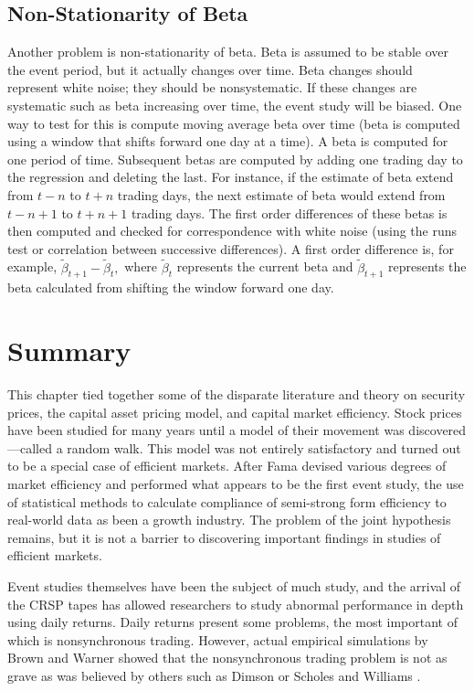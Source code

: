 \subsection{Non-Stationarity of Beta}

Another problem is non-stationarity of beta.  Beta is
assumed to be stable over the event period, but it actually
changes over time.  Beta changes should represent white
noise; they should be nonsystematic.
If these changes are systematic such as
beta increasing over time, the event study will be biased. 
One way to test for this is compute moving average beta over
time (beta is computed using a window that shifts forward
one day at a time).  A beta is computed for one period of
time.  Subsequent betas are computed by adding one trading
day to the regression and deleting the last.  For instance,
if the estimate of beta extend from $t-n$ to $t+n$ trading
days, the next estimate of beta would extend from $t-n+1$ to
$t+n+1$ trading days. The first order differences of these
betas is then computed
and checked for correspondence with white
noise (using the runs test or correlation between successive
differences).  A first order difference is, for example,
$\tilde \beta_{t+1} - \tilde \beta_{t},$ where $\tilde
\beta_{t}$ represents the current beta and $\tilde
\beta_{t+1}$ represents the beta calculated from shifting
the window forward one day.


\section{Summary}

This chapter tied together some of the disparate literature and
theory
on security prices, the capital asset pricing model, and capital
market efficiency.  Stock prices have been studied for many years
until a model of their movement was discovered---called a random
walk.
This model was not entirely satisfactory and turned out to be a
special case of efficient markets.  After Fama devised
various degrees of market efficiency and performed what
appears to be the first event study, the use of statistical
methods to calculate compliance of semi-strong form efficiency
to real-world data as been a growth industry.  The problem
of the joint hypothesis remains, but it is not a barrier to
discovering important findings in studies of efficient
markets.

Event studies themselves have been the subject of much
study, and the arrival of the CRSP tapes has allowed
researchers to study abnormal performance in depth using
daily returns.  Daily returns present some problems, the
most important of which is nonsynchronous trading.  However,
actual empirical simulations by Brown and Warner
\cite{brownwarner83} showed that
the nonsynchronous trading problem is not as grave as was
believed by others such as Dimson \cite{dimson79} or
Scholes and Williams \cite{scholes77}.
